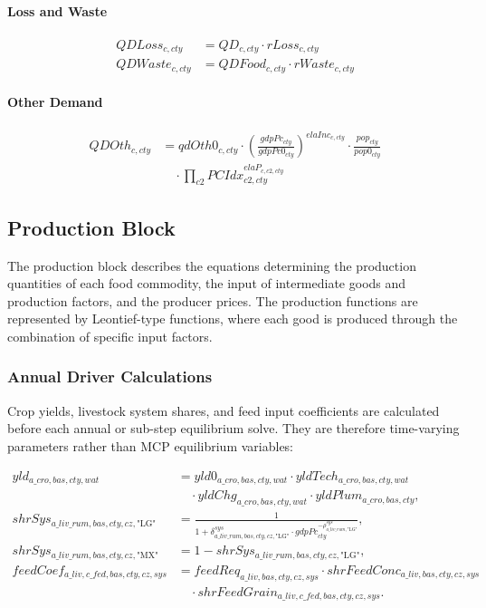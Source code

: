 \paragraph{Loss and Waste}
\begin{align}
  QDLoss_{c,cty}
  &= QD_{c,cty} \cdot rLoss_{c,cty}
  \tag{QDLossEq}\label{eq:QDLossEq}\\[.3em]
  QDWaste_{c,cty}
  &= QDFood_{c,cty} \cdot rWaste_{c,cty}
  \tag{QDWasteEq}\label{eq:QDWasteEq}
\end{align}

\paragraph{Other Demand}
\begin{align}
  QDOth_{c,cty}
  &= qdOth0_{c,cty}
     \cdot\left(\frac{gdpPc_{cty}}{gdpPc0_{cty}}\right)^{elaInc_{c,cty}}
     \cdot\frac{pop_{cty}}{pop0_{cty}}
     \nonumber\\
  &\quad\cdot\prod_{c2}PCIdx_{c2,cty}^{elaP_{c,c2,cty}}
  \tag{QDOthEq}\label{eq:QDOthEq}
\end{align}


\subsection{Production Block}

The production block describes the equations determining the production quantities of each food commodity, the input of intermediate goods and production factors, and the producer prices.  
The production functions are represented by Leontief-type functions, where each good is produced through the combination of specific input factors.

\subsubsection{Annual Driver Calculations}

Crop yields, livestock system shares, and feed input coefficients are calculated before each annual or sub-step equilibrium solve. They are therefore time-varying parameters rather than MCP equilibrium variables:

\begin{align*}
  yld_{a\_cro,bas,cty,wat}
  &= yld0_{a\_cro,bas,cty,wat}
     \cdot yldTech_{a\_cro,bas,cty,wat}
     \\
  &\quad
     \cdot yldChg_{a\_cro,bas,cty,wat}
     \cdot yldPlum_{a\_cro,bas,cty},\\
  shrSys_{a\_liv\_rum,bas,cty,cz,\text{"LG"}}
  &= \frac{1}{1+\delta^{sys}_{a\_liv\_rum,bas,cty,cz,\text{"LG"}}
     \cdot gdpPc_{cty}^{-\rho^{sys}_{a\_liv\_rum,\text{"LG"}}}},\\
  shrSys_{a\_liv\_rum,bas,cty,cz,\text{"MX"}}
  &= 1-shrSys_{a\_liv\_rum,bas,cty,cz,\text{"LG"}},\\
  feedCoef_{a\_liv,c\_fed,bas,cty,cz,sys}
  &= feedReq_{a\_liv,bas,cty,cz,sys}
     \cdot shrFeedConc_{a\_liv,bas,cty,cz,sys}
     \\
  &\quad
     \cdot shrFeedGrain_{a\_liv,c\_fed,bas,cty,cz,sys}.
\end{align*}

